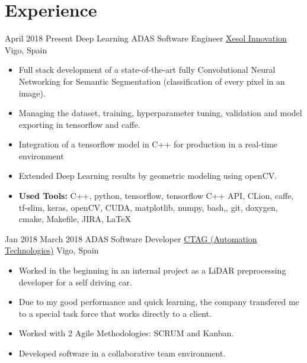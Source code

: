 \documentclass[letterpaper]{twentysecondcv} %
\begin{document}
\makeprofile %


\section{Experience}

\begin{twenty} %
\twentyitem
        {April 2018}
        {Present}
        {Deep Learning ADAS Software Engineer}
        {\href{https://www.xesolinnovation.com/}{Xesol Innovation}}
        {Vigo, Spain}
        {\begin{itemize}
        \item Full stack development of a state-of-the-art fully Convolutional Neural Networking for Semantic Segmentation (classification of every pixel in an image).
        \item Managing the dataset, training, hyperparameter tuning, validation and model exporting in tensorflow and caffe.
        \item Integration of a tensorflow model in C++ for production in a real-time environment
        \item Extended Deep Learning results by geometric modeling using openCV.
        \item \textbf{Used Tools:} C++, python, tensorflow, tensorflow C++ API, CLion, caffe, tf-slim, keras, openCV, CUDA, matplotlib, numpy, bash,, git, doxygen, cmake, Makefile, JIRA, \LaTeX
        \end{itemize}}
\twentyitem
        {Jan 2018}
        {March 2018}
        {ADAS Software Developer}
        {\href{https://www.ctag.com/}{CTAG (Automation Technologies)}}
        {Vigo, Spain}
        {\begin{itemize}
        \item Worked in the beginning in an internal project as a LiDAR preprocessing developer for a self driving car.
        \item Due to my good performance and quick learning, the company transfered me to a special task force that works directly to a client.
        \item Worked with 2 Agile Methodologies: SCRUM and Kanban.
        \item Developed software in a collaborative team environment.

\end{itemize}}
\end{twenty}
\end{document}
